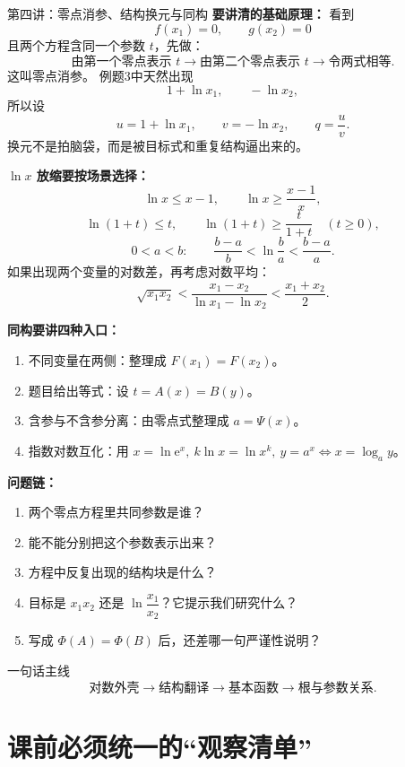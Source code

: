 \documentclass[11pt,a4paper]{ctexart}
\newcommand{\e}{\mathrm{e}}
\begin{document}
\begin{teachbox}{第四讲：零点消参、结构换元与同构}
\textbf{要讲清的基础原理：}
看到
\[
f(x_1)=0,\qquad g(x_2)=0
\]
且两个方程含同一个参数 $t$，先做：
\[
\boxed{
\text{由第一个零点表示 }t
\to
\text{由第二个零点表示 }t
\to
\text{令两式相等}.}
\]
这叫零点消参。
例题3中天然出现
\[
1+\ln x_1,\qquad -\ln x_2,
\]
所以设
\[
u=1+\ln x_1,\qquad v=-\ln x_2,\qquad q=\frac uv.
\]
换元不是拍脑袋，而是被目标式和重复结构逼出来的。

\textbf{$\ln x$ 放缩要按场景选择：}
\[
\ln x\le x-1,\qquad
\ln x\ge \frac{x-1}{x},
\]
\[
\ln(1+t)\le t,\qquad
\ln(1+t)\ge \frac{t}{1+t}\quad(t\ge0),
\]
\[
0<a<b:\qquad
\frac{b-a}{b}<\ln\frac ba<\frac{b-a}{a}.
\]
如果出现两个变量的对数差，再考虑对数平均：
\[
\sqrt{x_1x_2}
<
\frac{x_1-x_2}{\ln x_1-\ln x_2}
<
\frac{x_1+x_2}{2}.
\]

\textbf{同构要讲四种入口：}
\begin{enumerate}
  \item 不同变量在两侧：整理成 $F(x_1)=F(x_2)$。
  \item 题目给出等式：设 $t=A(x)=B(y)$。
  \item 含参与不含参分离：由零点式整理成 $a=\Psi(x)$。
  \item 指数对数互化：用 $x=\ln \e^x,\ k\ln x=\ln x^k,\ y=a^x\Longleftrightarrow x=\log_a y$。
\end{enumerate}

\textbf{问题链：}
\begin{enumerate}
  \item 两个零点方程里共同参数是谁？
  \item 能不能分别把这个参数表示出来？
  \item 方程中反复出现的结构块是什么？
  \item 目标是 $x_1x_2$ 还是 $\ln\dfrac{x_1}{x_2}$？它提示我们研究什么？
  \item 写成 $\Phi(A)=\Phi(B)$ 后，还差哪一句严谨性说明？
\end{enumerate}
\end{teachbox}

\begin{keybox}{一句话主线}
\[
\boxed{\text{对数外壳}\to\text{结构翻译}\to\text{基本函数}\to\text{根与参数关系}.}
\]
\end{keybox}

\section{课前必须统一的“观察清单”}
\end{document}
